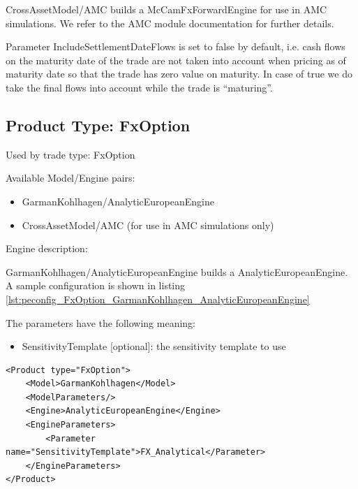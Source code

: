 CrossAssetModel/AMC builds a McCamFxForwardEngine for use in AMC simulations. We refer to the AMC module documentation
for further details.

Parameter IncludeSettlementDateFlows is set to false by default, i.e. cash flows on the maturity date of the trade are
not taken into account when pricing as of maturity date so that the trade has zero value on maturity. In case of true
we do take the final flows into account while the trade is ``maturing''.

\subsection{Product Type: FxOption}

Used by trade type: FxOption

Available Model/Engine pairs:

\begin{itemize}
\item GarmanKohlhagen/AnalyticEuropeanEngine
\item CrossAssetModel/AMC (for use in AMC simulations only)
\end{itemize}

Engine description:

GarmanKohlhagen/AnalyticEuropeanEngine builds a AnalyticEuropeanEngine. A sample configuration is shown in listing
\ref{lst:peconfig_FxOption_GarmanKohlhagen_AnalyticEuropeanEngine}

The parameters have the following meaning:

\begin{itemize}
\item SensitivityTemplate [optional]: the sensitivity template to use
\end{itemize}

\begin{longlisting}
\begin{verbatim}
<Product type="FxOption">
    <Model>GarmanKohlhagen</Model>
    <ModelParameters/>
    <Engine>AnalyticEuropeanEngine</Engine>
    <EngineParameters>
        <Parameter name="SensitivityTemplate">FX_Analytical</Parameter>
    </EngineParameters>
</Product>
\end{verbatim}
\caption{Configuration for Product FxOption, Model GarmanKohlhagen, Engine AnalyticEuropeanEngine}
\label{lst:peconfig_FxOption_GarmanKohlhagen_AnalyticEuropeanEngine}
\end{longlisting}

